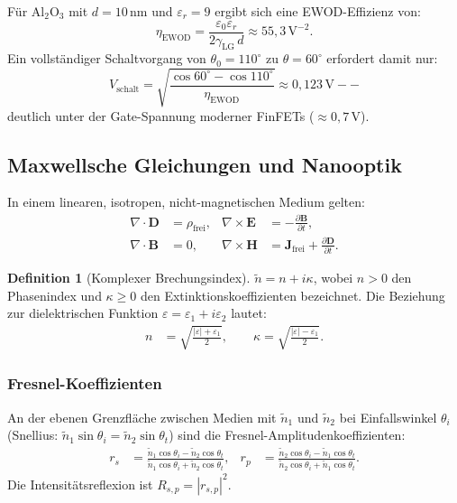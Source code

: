 ﻿\documentclass[a4paper,12pt]{scrreprt}
\theoremstyle{definition}
\newtheorem{definition}{Definition}[section]
\newcommand{\vect}[1]{\bm{#1}}
\begin{document}
Für Al$_2$O$_3$ mit $d = 10$\,nm und $\varepsilon_r = 9$ ergibt sich eine
EWOD-Effizienz von:
\begin{equation}
  \eta_{\mathrm{EWOD}} = \frac{\varepsilon_0 \varepsilon_r}{2\gamma_{\mathrm{LG}}\, d}
  \approx 55{,}3\,\text{V}^{-2}.
\end{equation}
Ein vollständiger Schaltvorgang von $\theta_0 = {110}^{\circ}$ zu $\theta = {60}^{\circ}$
erfordert damit nur:
\begin{equation}
  V_{\mathrm{schalt}} = \sqrt{\frac{\cos {60}^{\circ} - \cos {110}^{\circ}}{\eta_{\mathrm{EWOD}}}}
  \approx 0{,}123\,\text{V} -- 
\end{equation}
deutlich unter der Gate-Spannung moderner FinFETs ($\approx 0{,}7$\,V).

\subsection{Maxwellsche Gleichungen und Nanooptik}

In einem linearen, isotropen, nicht-magnetischen Medium gelten:
\begin{align}
  \nabla \cdot \vect{D} &= \rho_\mathrm{frei}, &
  \nabla \times \vect{E} &= -\frac{\partial \vect{B}}{\partial t}, \\
  \nabla \cdot \vect{B} &= 0, &
  \nabla \times \vect{H} &= \vect{J}_\mathrm{frei} + \frac{\partial \vect{D}}{\partial t}.
\end{align}

\begin{definition}[Komplexer Brechungsindex]
  \label{def:brechungsindex}
  $\tilde{n} = n + i\kappa$, wobei $n > 0$ den Phasenindex und $\kappa \geq 0$
  den Extinktionskoeffizienten bezeichnet. Die Beziehung zur dielektrischen
  Funktion $\varepsilon = \varepsilon_1 + i\varepsilon_2$ lautet:
  \begin{align}
    n &= \sqrt{\tfrac{|\varepsilon| + \varepsilon_1}{2}}, \qquad
    \kappa = \sqrt{\tfrac{|\varepsilon| - \varepsilon_1}{2}}.
  \end{align}
\end{definition}

\subsubsection{Fresnel-Koeffizienten}

An der ebenen Grenzfläche zwischen Medien mit $\tilde{n}_1$ und $\tilde{n}_2$
bei Einfallswinkel $\theta_i$ (Snellius: $\tilde{n}_1\sin\theta_i = \tilde{n}_2\sin\theta_t$)
sind die Fresnel-Amplitudenkoeffizienten:
\begin{align}
  r_s &= \frac{\tilde{n}_1 \cos\theta_i - \tilde{n}_2 \cos\theta_t}
  {\tilde{n}_1 \cos\theta_i + \tilde{n}_2 \cos\theta_t}, &
  r_p &= \frac{\tilde{n}_2 \cos\theta_i - \tilde{n}_1 \cos\theta_t}
  {\tilde{n}_2 \cos\theta_i + \tilde{n}_1 \cos\theta_t}.
\end{align}
Die Intensitätsreflexion ist $R_{s,p} = |r_{s,p}|^2$.
\end{document}
